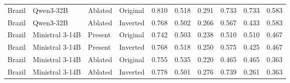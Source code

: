 \begin{tabular}{llllrrrrrr}
Brazil & Qwen3-32B & Ablated & Original & 0.810 & 0.518 & 0.291 & 0.733 & 0.733 & 0.583 \\
Brazil & Qwen3-32B & Ablated & Inverted & 0.768 & 0.502 & 0.266 & 0.567 & 0.433 & 0.583 \\
Brazil & Ministral 3-14B & Present & Original & 0.742 & 0.503 & 0.238 & 0.510 & 0.510 & 0.467 \\
Brazil & Ministral 3-14B & Present & Inverted & 0.768 & 0.518 & 0.250 & 0.575 & 0.425 & 0.467 \\
Brazil & Ministral 3-14B & Ablated & Original & 0.755 & 0.535 & 0.220 & 0.465 & 0.465 & 0.363 \\
Brazil & Ministral 3-14B & Ablated & Inverted & 0.778 & 0.501 & 0.276 & 0.739 & 0.261 & 0.363 \\
\bottomrule
\end{tabular}
